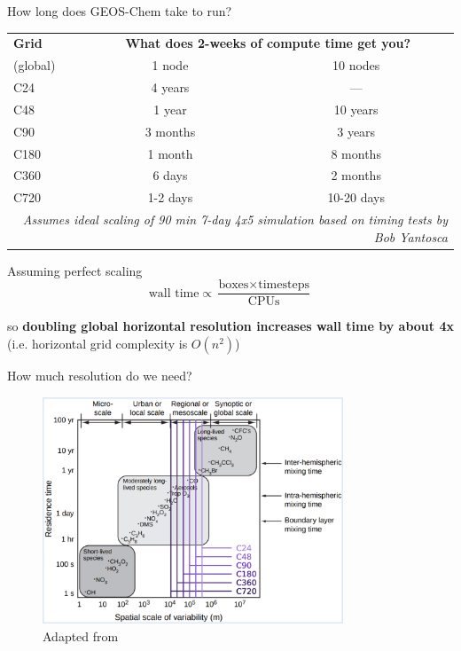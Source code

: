 \documentclass[10pt]{beamer}
\newcommand{\semitransp}[2][35]{\color{fg!#1}#2}
\begin{document}
\begin{frame}[fragile]{How long does GEOS-Chem take to run?}
    \small
    \begin{table}[]
    \begin{tabular}{lcc}
        \hline
        \textbf{Grid} & \multicolumn{2}{c}{\textbf{What does 2-weeks of compute time get you?}} \\ 
        (global) & 1 node & 10 nodes \\ 
        \hline
        C24 & 4 years & --- \\ 
        C48 & 1 year &  10 years \\ 
        C90 & \semitransp[60]{3 months} & 3 years \\ 
        C180 & \semitransp[60]{1 month} & 8 months \\ 
        C360 & \semitransp[60]{6 days} & 2 months \\ 
        \semitransp[60]{C720} & \semitransp[60]{1-2 days} & \semitransp[60]{10-20 days} \\ \hline
        \multicolumn{3}{r}{\fontsize{3}{3}\selectfont\textit{Assumes ideal scaling of 90 min 7-day 4x5 simulation based on timing tests by Bob Yantosca }} \\ 
    \end{tabular}
    \end{table}
    
    Assuming perfect scaling
    $$\text{wall time} \propto \frac{\text{boxes} \times \text{timesteps}}{\text{CPUs}}$$
    
    so \textbf{doubling global horizontal resolution increases wall time by about 4x} (i.e. horizontal grid complexity is $O(n^2)$)    
\end{frame}

\begin{frame}[fragile]{How much resolution do we need?}
    \begin{figure}
        \centering
        \includegraphics[width=0.8\textwidth]{species-scale.eps}
        \captionsetup{labelformat=empty}
        \caption{Adapted from \cite{wallace_atmospheric_2006}}
    \end{figure}
\end{frame}
\end{document}
